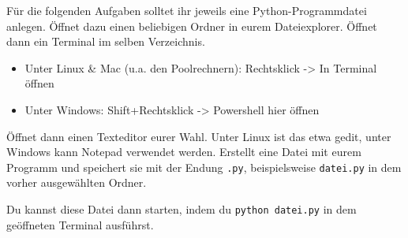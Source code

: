 Für die folgenden Aufgaben solltet ihr jeweils eine Python-Programmdatei
anlegen. Öffnet dazu einen beliebigen Ordner in eurem Dateiexplorer. Öffnet
dann ein Terminal im selben Verzeichnis.

\begin{itemize}
    \item Unter Linux \& Mac (u.a. den Poolrechnern): Rechtsklick -> In Terminal öffnen
    \item Unter Windows: Shift+Rechtsklick -> Powershell hier öffnen
\end{itemize}

Öffnet dann einen Texteditor eurer Wahl. Unter Linux ist das etwa gedit, unter
Windows kann Notepad verwendet werden. Erstellt eine Datei mit eurem Programm
und speichert sie mit der Endung \texttt{.py}, beispielsweise \texttt{datei.py}
in dem vorher ausgewählten Ordner.

Du kannst diese Datei dann starten, indem du \texttt{python datei.py} in dem geöffneten Terminal ausführst.

